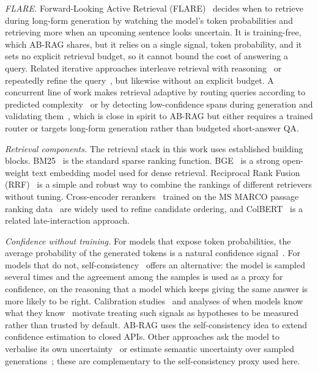 \documentclass[conference,a4paper,10pt]{IEEEtran}
\begin{document}
\textit{FLARE.}
Forward-Looking Active Retrieval (FLARE)~\cite{jiang2023flare} decides when to retrieve
during long-form generation by watching the model's token probabilities and retrieving
more when an upcoming sentence looks uncertain. It is training-free, which AB-RAG shares,
but it relies on a single signal, token probability, and it sets no explicit retrieval
budget, so it cannot bound the cost of answering a query. Related iterative approaches
interleave retrieval with reasoning~\cite{trivedi2023interleaving} or repeatedly refine
the query~\cite{shao2023iterative}, but likewise without an explicit budget. A concurrent line of work makes retrieval
adaptive by routing queries according to predicted complexity~\cite{jeong2024adaptive} or
by detecting low-confidence spans during generation and validating
them~\cite{varshney2023stitch}, which is close in spirit to AB-RAG but either requires a
trained router or targets long-form generation rather than budgeted short-answer QA.

\textit{Retrieval components.}
The retrieval stack in this work uses established building blocks.
BM25~\cite{robertson2009bm25, robertson1995okapi} is the standard sparse ranking
function. BGE~\cite{xiao2024cpack} is a strong open-weight text embedding model used for
dense retrieval. Reciprocal Rank Fusion (RRF)~\cite{cormack2009rrf} is a simple and
robust way to combine the rankings of different retrievers without tuning. Cross-encoder
rerankers~\cite{nogueira2019bert} trained on the MS MARCO passage ranking
data~\cite{nguyen2016msmarco} are widely used to refine candidate ordering, and
ColBERT~\cite{khattab2020colbert} is a related late-interaction approach.

\textit{Confidence without training.}
For models that expose token probabilities, the average probability of the generated
tokens is a natural confidence signal~\cite{kadavath2022know, jiang2021calibration}. For
models that do not, self-consistency~\cite{wang2023selfconsistency} offers an
alternative: the model is sampled several times and the agreement among the samples is
used as a proxy for confidence, on the reasoning that a model which keeps giving the same
answer is more likely to be right. Calibration studies~\cite{guo2017calibration,
gal2016dropout} and analyses of when models know what they know~\cite{kadavath2022know,
mallen2023trust} motivate treating such signals as hypotheses to be measured rather than
trusted by default. AB-RAG uses the self-consistency idea to extend confidence estimation
to closed APIs. Other approaches ask the model to verbalise its own
uncertainty~\cite{lin2022teaching, si2023prompting} or estimate semantic uncertainty over
sampled generations~\cite{kuhn2023semantic}; these are complementary to the
self-consistency proxy used here.
\end{document}
